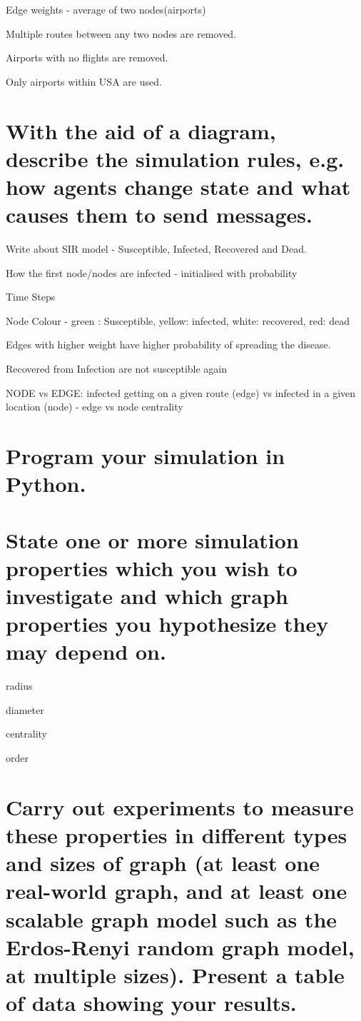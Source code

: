 \documentclass[a4paper,11pt]{article}
\begin{document}
Edge weights - average of two nodes(airports)

Multiple routes between any two nodes are removed.


Airports with no flights are removed.

Only airports within USA are used.

\section{With the aid of a diagram, describe the simulation rules, e.g. how agents change state and what causes them to send messages.}

Write about SIR model - Susceptible, Infected, Recovered and Dead.


How the first node/nodes are infected - initialised with probability


Time Steps


 Node Colour - green : Susceptible, yellow: infected, white: recovered, red: dead

Edges with higher weight have higher probability of spreading the disease.

Recovered from Infection are not susceptible again

NODE vs EDGE: infected getting on a given route (edge) vs infected in a given location (node) - edge vs node centrality

\section{Program your simulation in Python.}

\section{State one or more simulation properties which you wish to investigate and which graph properties you hypothesize they may depend on.}

radius


diameter


centrality


order

\section{Carry out experiments to measure these properties in different types and sizes of graph (at least one real-world graph, and at least one scalable graph model such as the Erdos-Renyi random graph model, at multiple sizes). Present a table of data showing your results.}
\end{document}
